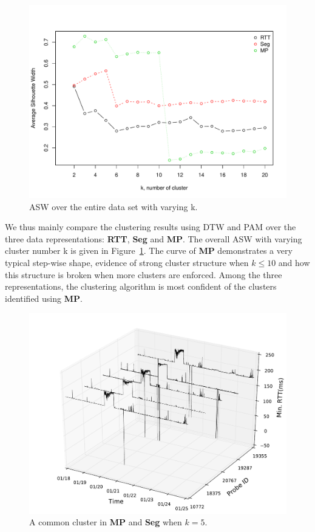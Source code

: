 \begin{figure}[!htb]
\centering
\includegraphics[width=.8\textwidth]{gfx/chap3/sil_comp.pdf}
\caption{\ac{ASW} over the entire data set with varying k.}
\label{fig:sil_comp}
\end{figure}
We thus mainly compare the clustering results using \ac{DTW} and \ac{PAM} over the three data representations: \textbf{RTT}, \textbf{Seg} and \textbf{MP}. 
The overall \ac{ASW} with varying cluster number k is given in Figure~\ref{fig:sil_comp}. 
The curve of \textbf{MP} demonstrates a very typical step-wise shape, evidence of strong cluster structure when $k \leq 10$ and how this structure is broken when more clusters are enforced.
Among the three representations, the clustering algorithm is most confident of the clusters identified using \textbf{MP}.

\begin{figure}[!htb]
\centering
\includegraphics[width=.9\textwidth]{gfx/chap3/rtt3d_mp_cls2.pdf}
\caption{A common cluster in \textbf{MP} and \textbf{Seg} when $k=5$.}
\label{fig:rtt3d_mp_cls2}
\end{figure}

